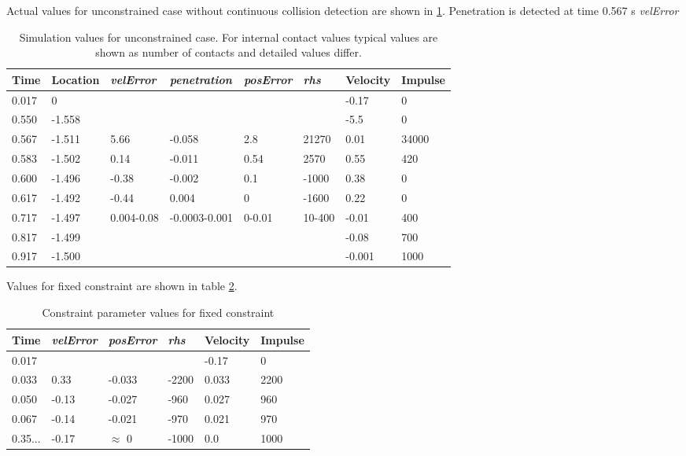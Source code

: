 Actual values for unconstrained case without continuous collision detection
are shown in \ref{tab:freeBlockValues}. Penetration is detected at time 0.567 s
{\it velError}

\begin {table}[htb!]
\begin{center}
\begin{tabular}{|l| l|l| l|l|l|l|l|}
\hline
{\bf Time} & 
{\bf Location} &
{\it velError} & {\it penetration} & {\it posError} & {\it rhs} &
{\bf Velocity} & 
{\bf Impulse} \\  \hline
0.017 &  0 & & & &  &-0.17 & 0 \\  \hline
0.550 &  -1.558 & & & & & -5.5 & 0 \\  \hline
0.567 &  -1.511 & 5.66 &-0.058 &2.8 &  21270 & 0.01 & 34000 \\  \hline
0.583 &  -1.502 & 0.14 &-0.011 & 0.54& 2570  & 0.55 & 420 \\  \hline
0.600 &  -1.496 & -0.38&-0.002 & 0.1  & -1000& 0.38 & 0 \\  \hline
0.617 &  -1.492 &-0.44 & 0.004 & 0     & -1600& 0.22 & 0 \\  \hline
0.717 &  -1.497 &0.004-0.08  &-0.0003-0.001 &0-0.01 & 10-400 & -0.01 & 400 \\  \hline
0.817 &  -1.499 & & & & & -0.08 & 700 \\  \hline
0.917 &  -1.500 & & & & & -0.001 & 1000 \\  \hline
\end {tabular}
\end{center}
\caption {Simulation values for unconstrained case. 
For internal contact values typical values are shown
as number of contacts and detailed values differ.} 
\label{tab:freeBlockValues} 
\end {table}

Values for fixed constraint are shown in table
\ref{tab:fixedBlockValues}. 

\begin {table}[htb!]
\begin{center}
\begin{tabular}{|l| l| l|l|l|l|}
\hline
{\bf Time} & 
{\it velError} & {\it posError} & {\it rhs} &
{\bf Velocity} & 
{\bf Impulse} \\  \hline
0.017 &  & & & -0.17 & 0 \\  \hline
0.033 &  0.33 & -0.033 & -2200 & 0.033 & 2200 \\  \hline
0.050 &  -0.13 & -0.027 & -960 & 0.027 & 960 \\  \hline
0.067 &  -0.14 & -0.021 & -970 & 0.021 & 970 \\  \hline
0.35... &  -0.17 & $\approx$ 0 & -1000 &0.0 & 1000 \\  \hline
\end {tabular}
\end{center}
\caption {Constraint parameter values for fixed constraint} \label{tab:fixedBlockValues} 
\end {table}

